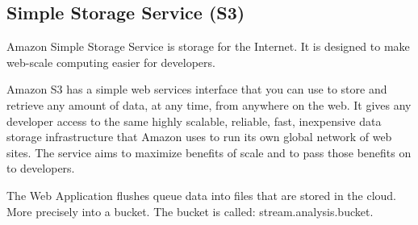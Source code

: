 \subsection{Simple Storage Service (S3)}
\label{chap:04:03:05}

Amazon Simple Storage Service is storage for the Internet. It is designed to make web-scale computing easier for developers.\cite{s3}

Amazon S3 has a simple web services interface that you can use to store and retrieve any amount of data, at any time, from anywhere on the web. It gives any developer access to the same highly scalable, reliable, fast, inexpensive data storage infrastructure that Amazon uses to run its own global network of web sites. The service aims to maximize benefits of scale and to pass those benefits on to developers.\cite{s3}

The Web Application flushes queue data into files that are stored in the cloud. More precisely into a bucket. The bucket is called: stream.analysis.bucket.

